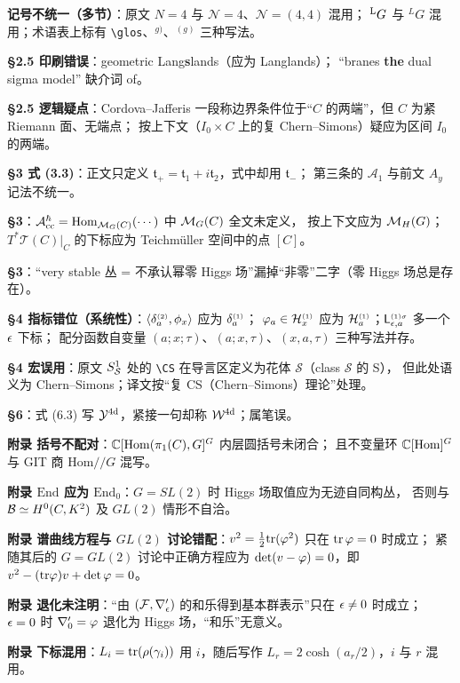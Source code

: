 \begin{enumerate}[label=\textbf{[\arabic*]},leftmargin=*]
  \item \textbf{记号不统一（多节）}：原文 $N=4$ 与 $\mathcal{N}=4$、$\mathcal{N}=(4,4)$ 混用；
        ${}^{\rm L}G$ 与 ${}^{L}G$ 混用；术语表上标有 \verb|\glos|、$^{g)}$、$^{(g)}$ 三种写法。
  \item \textbf{§2.5 印刷错误}：geometric Lang\textbf{s}lands（应为 Langlands）；
        “branes \textbf{the} dual sigma model” 缺介词 of。
  \item \textbf{§2.5 逻辑疑点}：Cordova--Jafferis 一段称边界条件位于“$C$ 的两端”，但 $C$ 为紧 Riemann 面、无端点；
        按上下文（$I_0\times C$ 上的复 Chern--Simons）疑应为区间 $I_0$ 的两端。
  \item \textbf{§3 式 (3.3)}：正文只定义 $\mathfrak{t}_+=\mathfrak{t}_1+i\mathfrak{t}_2$，式中却用 $\mathfrak{t}_-$；
        第三条的 $\mathcal{A}_1$ 与前文 $A_y$ 记法不统一。
  \item \textbf{§3}：$\mathcal{A}_{\rm cc}^\hbar=\mathrm{Hom}_{\mathcal{M}_G(C)}(\cdots)$ 中 $\mathcal{M}_G(C)$ 全文未定义，
        按上下文应为 $\mathcal{M}_H(G)$；$T^*\mathcal{T}(C)|_{C}$ 的下标应为 Teichmüller 空间中的点 $[C]$。
  \item \textbf{§3}：“very stable 丛 = 不承认幂零 Higgs 场”漏掉“非零”二字（零 Higgs 场总是存在）。
  \item \textbf{§4 指标错位（系统性）}：$\langle\delta_a^{\scriptscriptstyle(2)},\phi_x\rangle$ 应为 $\delta_a^{\scriptscriptstyle(1)}$；
        $\varphi_a\in\mathcal{H}_x^{\scriptscriptstyle(1)}$ 应为 $\mathcal{H}_a^{\scriptscriptstyle(1)}$；$\mathsf{L}_{\epsilon,a}^{\scriptscriptstyle(1)\sigma}$ 多一个 $\epsilon$ 下标；
        配分函数自变量 $(a;x;\tau)$、$(a;x,\tau)$、$(x,a,\tau)$ 三种写法并存。
  \item \textbf{§4 宏误用}：原文 $S^1_{\mathcal{S}}$ 处的 \verb|\CS| 在导言区定义为花体 $\mathcal{S}$（class $\mathcal{S}$ 的 S），
        但此处语义为 Chern--Simons；译文按“复 CS（Chern--Simons）理论”处理。
  \item \textbf{§6}：式 (6.3) 写 $\mathcal{Y}^{\rm 4d}$，紧接一句却称 $\mathcal{W}^{\rm 4d}$；属笔误。
  \item \textbf{附录 括号不配对}：$\mathbb{C}[\mathrm{Hom}(\pi_1(C),G]^G$ 内层圆括号未闭合；
        且不变量环 $\mathbb{C}[\mathrm{Hom}]^G$ 与 GIT 商 $\mathrm{Hom}/\!/G$ 混写。
  \item \textbf{附录 $\mathrm{End}$ 应为 $\mathrm{End}_0$}：$G=SL(2)$ 时 Higgs 场取值应为无迹自同构丛，
        否则与 $\mathcal{B}\simeq H^0(C,K^2)$ 及 $GL(2)$ 情形不自洽。
  \item \textbf{附录 谱曲线方程与 $GL(2)$ 讨论错配}：$v^2=\frac12\mathrm{tr}(\varphi^2)$ 只在 $\mathrm{tr}\,\varphi=0$ 时成立；
        紧随其后的 $G=GL(2)$ 讨论中正确方程应为 $\det(v-\varphi)=0$，即 $v^2-(\mathrm{tr}\varphi)v+\det\varphi=0$。
  \item \textbf{附录 退化未注明}：“由 $(\mathcal{F},\nabla_\epsilon')$ 的和乐得到基本群表示”只在 $\epsilon\neq0$ 时成立；
        $\epsilon=0$ 时 $\nabla_0'=\varphi$ 退化为 Higgs 场，“和乐”无意义。
  \item \textbf{附录 下标混用}：$L_i=\mathrm{tr}(\rho(\gamma_i))$ 用 $i$，随后写作 $L_r=2\cosh(a_r/2)$，$i$ 与 $r$ 混用。
\end{enumerate}

